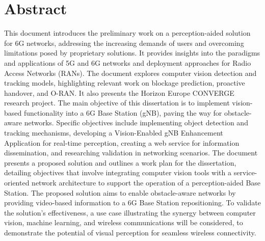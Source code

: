 
\chapter*{Abstract}

This document introduces the preliminary work on a perception-aided solution for 6G networks, addressing the increasing demands of users and overcoming limitations posed by proprietary solutions. It provides insights into the paradigms and applications of 5G and 6G networks and deployment approaches for Radio Access Networks (RANs). The document explores computer vision detection and tracking models, highlighting relevant work on blockage prediction, proactive handover, and O-RAN. It also presents the Horizon Europe CONVERGE research project. The main objective of this dissertation is to implement vision-based functionality into a 6G Base Station (gNB), paving the way for obstacle-aware networks. Specific objectives include implementing object detection and tracking mechanisms, developing a Vision-Enabled gNB Enhancement Application for real-time perception, creating a web service for information dissemination, and researching validation in networking scenarios. The document presents a proposed solution and outlines a work plan for the dissertation, detailing objectives that involve integrating computer vision tools with a service-oriented network architecture to support the operation of a perception-aided Base Station. The proposed solution aims to enable obstacle-aware networks by providing video-based information to a 6G Base Station repositioning. To validate the solution's effectiveness, a use case illustrating the synergy between computer vision, machine learning, and wireless communications will be considered, to demonstrate the potential of visual perception for seamless wireless connectivity.